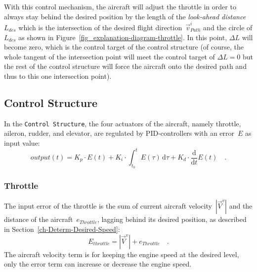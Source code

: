 \documentclass[11pt,a4paper]{scrartcl}		%
\begin{document}
With this control mechanism, the aircraft will adjust the throttle in order to always stay behind the desired position by the length of the \textsl{look-ahead distance}~$L_{des}$ which is the intersection of the desired flight direction~$\vec{v}_{Path}^i$ and the circle of $L_{des}$ as shown in Figure~\ref{fig_explanation-diagram-throttle}. In this point, $\Delta L$ will become zero, which is the control target of the control structure (of course, the whole tangent of the intersection point will meet the control target of $\Delta L = 0$ but the rest of the control structure will force the aircraft onto the desired path and thus to this one intersection point).  

\medskip





\subsection{Control Structure}

In the \texttt{Control Structure}, the four actuators of the aircraft, namely throttle, aileron, rudder, and elevator, are regulated by PID-controllers with an error~$E$ as input value:
\begin{equation}
output(t) = K_p \cdot E(t) + K_i \cdot \int_{t_0}^t E(\tau)\, \mathrm{d}\tau + K_d \cdot \frac{\mathrm{d}}{\mathrm{d}t}E(t)\quad .
\end{equation}

\subsubsection*{Throttle}
The input error of the throttle is the sum of current aircraft velocity~$|\vec{V}^v|$ and the distance of the aircraft~$e_{Throttle}$, lagging behind its desired position, as described in Section~\ref{ch-Determ-Desired-Speed}:
\begin{equation}
E_{throttle} = |\vec{V}^v| + e_{Throttle} \quad .
\end{equation} 
The aircraft velocity term is for keeping the engine speed at the desired level, only the error term can increase or decrease the engine speed.
\end{document}
